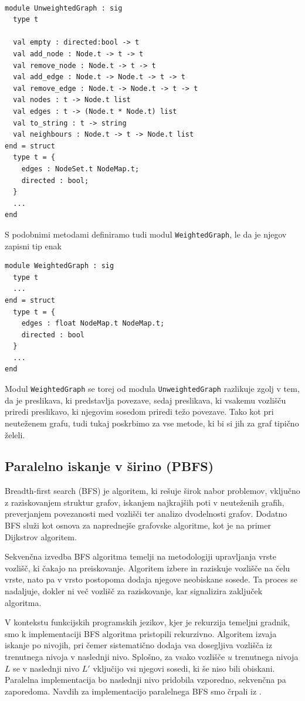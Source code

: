 \documentclass[fin1, tisk]{fmfdelo}
\begin{document}
\begin{lstlisting}

module UnweightedGraph : sig
  type t

  val empty : directed:bool -> t
  val add_node : Node.t -> t -> t
  val remove_node : Node.t -> t -> t
  val add_edge : Node.t -> Node.t -> t -> t
  val remove_edge : Node.t -> Node.t -> t -> t
  val nodes : t -> Node.t list
  val edges : t -> (Node.t * Node.t) list
  val to_string : t -> string
  val neighbours : Node.t -> t -> Node.t list
end = struct
  type t = {
    edges : NodeSet.t NodeMap.t;
    directed : bool;
  }
  ...
end

\end{lstlisting}
S podobnimi metodami definiramo tudi modul \texttt{WeightedGraph}, le da je njegov zapisni tip enak
\begin{lstlisting}
module WeightedGraph : sig
  type t
  ...
end = struct
  type t = {
    edges : float NodeMap.t NodeMap.t; 
    directed : bool
  }
  ...
end
\end{lstlisting}

Modul \texttt{WeightedGraph} se torej od modula \texttt{UnweightedGraph} razlikuje zgolj v tem, da je preslikava, ki
predstavlja povezave, sedaj preslikava, ki vsakemu vozlišču priredi preslikavo, ki njegovim sosedom priredi težo povezave.
Tako kot pri neuteženem grafu, tudi tukaj poskrbimo za vse metode, ki bi si jih za graf tipično želeli.


\subsection{Paralelno iskanje v širino (PBFS)}

Breadth-first search (BFS) je algoritem, ki rešuje širok nabor problemov, vključno z raziskovanjem struktur
grafov, iskanjem najkrajših poti v neuteženih grafih, preverjanjem povezanosti med vozlišči ter analizo dvodelnosti grafov.
Dodatno BFS služi kot osnova za naprednejše grafovske algoritme, kot je na primer Dijkstrov algoritem.

Sekvenčna izvedba BFS algoritma temelji na metodologiji upravljanja vrste vozlišč, ki čakajo na preiskovanje.
Algoritem izbere in raziskuje vozlišče na čelu vrste, nato pa v vrsto postopoma dodaja njegove neobiskane sosede.
Ta proces se nadaljuje, dokler ni več vozlišč za raziskovanje, kar signalizira zaključek algoritma.

V kontekstu funkcijskih programskih jezikov, kjer je rekurzija temeljni gradnik, smo k implementaciji BFS algoritma
pristopili rekurzivno.
Algoritem izvaja iskanje po nivojih, pri čemer sistematično dodaja vsa dosegljiva vozlišča iz trenutnega nivoja v naslednji nivo.
Splošno, za vsako vozlišče $u$ trenutnega nivoja $L$ se v naslednji nivo $L'$ vključijo vsi njegovi sosedi, ki še niso
bili obiskani. Paralelna implementacija bo naslednji nivo pridobila vzporedno, sekvenčna pa zaporedoma.
Navdih za implementacijo paralelnega BFS smo črpali iz \cite{spaa2010}.
\end{document}
